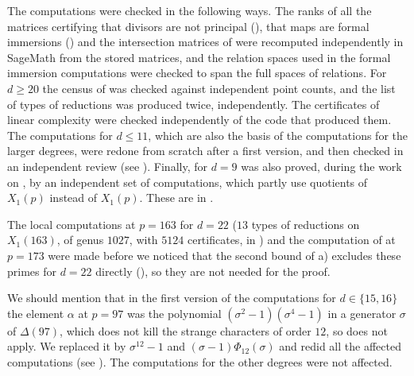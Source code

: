 The computations were checked in the following ways. The ranks of all the matrices certifying that divisors are not principal (), that maps are formal immersions () and the intersection matrices of  were recomputed independently in SageMath from the stored matrices, and the relation spaces used in the formal immersion computations were checked to span the full spaces of relations. For $d\geq20$ the census of  was checked against independent point counts, and the list of types of reductions was produced twice, independently. The certificates of linear complexity were checked independently of the code that produced them. The computations for $d\leq 11$, which are also the basis of the computations for the larger degrees, were redone from scratch after a first version, and then checked in an independent review (see ). Finally,  for $d=9$ was also proved, during the work on \cite{N69}, by an independent set of computations, which partly use quotients of $X_1(p)$ instead of $X_1(p)$. These are in .

The local computations at $p=163$ for $d=22$ ($13$ types of reductions on $X_1(163)$, of genus $1027$, with $5124$ certificates, in ) and the computation of  at $p=173$ were made before we noticed that the second bound of  a) excludes these primes for $d=22$ directly (), so they are not needed for the proof.

We should mention that in the first version of the computations for $d\in\{15,16\}$ the element $\alpha$ at $p=97$ was the polynomial $(\sigma^2-1)(\sigma^4-1)$ in a generator $\sigma$ of $\Delta(97)$, which does not kill the strange characters of order $12$, so  does not apply. We replaced it by $\sigma^{12}-1$ and $(\sigma-1)\Phi_{12}(\sigma)$ and redid all the affected computations (see ). The computations for the other degrees were not affected.
